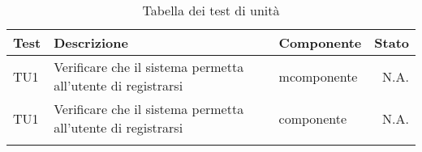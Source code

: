 \begin{longtable}{llXr}%
\toprule
\textbf{Test} & \textbf{Descrizione} & \textbf{Componente} & \textbf{Stato}\\
\toprule
TU1&Verificare che il sistema permetta all'utente di registrarsi&mcomponente&N.A.\\
\midrule
TU1&Verificare che il sistema permetta all'utente di registrarsi&componente&N.A.\\
\bottomrule
\caption{Tabella dei test di unità}
\end{longtable}